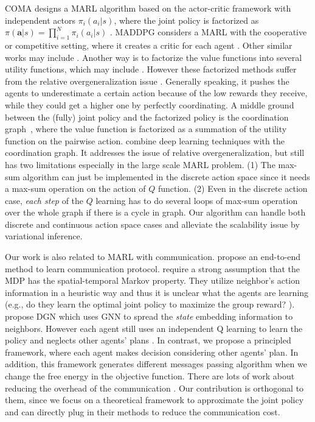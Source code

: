 \documentclass[11pt,a4paper]{article}
\theoremstyle{definition}
\begin{document}
COMA designs a MARL algorithm based on the actor-critic framework with independent actors $\pi_{i}(a_i|s)$, where the joint policy is factorized as $\pi(\mathbf{a}|s)=\prod_{i=1}^{N}\pi_i(a_i|s)$ \citep{foerster2018counterfactual}.   MADDPG considers a MARL with the cooperative or competitive setting, where it creates a critic for each agent \citep{lowe2017multi}. Other similar works may include \citep{de2019multi,wei2018multiagent}. Another way is to factorize the value functions into several utility functions, which may include \citet{sunehag2018value,rashid2018qmix,son2019qtran}.  However these factorized methods suffer from the relative overgeneralization issue  \citep{castellini2019representational,palmer2018lenient}. Generally speaking, it pushes the agents to underestimate a certain action because of the low rewards they receive, while they could get a higher one by perfectly coordinating. A middle ground between the (fully) joint policy and the factorized policy is the coordination graph~\citep{guestrin2002coordinated}, where the value function is factorized as a summation of the utility function on the pairwise action. \citet{bohmer2019deep,castellini2019representational} combine deep learning techniques with the coordination graph. It addresses the issue of relative overgeneralization, but still has two limitations especially in the large scale MARL problem. (1) The max-sum algorithm can just be implemented in the discrete action space since it needs a max-sum operation on the action of $Q$ function. (2) Even in the discrete action case,  \emph{each step} of the $Q$ learning has to do several loops of max-sum operation over the whole graph if there is a cycle in graph. Our algorithm can handle both discrete and continuous action space cases and alleviate the scalability issue by variational inference.

Our work is also related to MARL with  communication. \citet{foerster2016learning} propose an end-to-end method to learn communication protocol.  \citet{chu2020multi} require a strong assumption that the MDP has the spatial-temporal Markov property. They utilize neighbor's action information in a heuristic way and thus it is unclear what the agents are learning (e.g., do they learn the optimal joint policy to maximize the group reward? ). \citet{jiang2020graph} propose DGN which uses GNN to spread the \emph{state} embedding information to neighbors. However each agent still uses an independent Q learning to learn the policy and neglects other agents' plans \citep{bohmer2019deep}. In contrast,  we propose a principled framework, where each agent makes decision considering other agents' plan.  In addition, this framework generates different messages passing algorithm when we change the free energy in the objective function. There are lots of work about reducing the overhead of the communication \citep{ding2020learning,zhang2020succinct}. Our contribution is orthogonal to them, since we focus on a theoretical framework to approximate the joint policy and can directly plug in their methods to reduce the communication cost.
\end{document}
